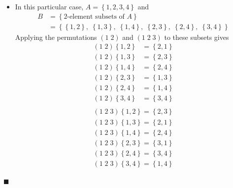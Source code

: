 \documentclass[12pt]{article}
\renewcommand{\qed}{\hfill$\blacksquare$}
\renewenvironment{proof}{\begin{addmargin}[1em]{0em}\begin{newproof}}{\end{newproof}\end{addmargin}\qed}
\begin{document}
\begin{proof}
\begin{itemize}
    \item In this particular case, $A=\left\{1,2,3,4\right\}$ and
    \begin{equation*}
        \begin{split}
            B & = \left\{ \text{2-element subsets of } A \right\} \\
            & = \left\{ \left\{1,2\right\}, \; \left\{1,3\right\}, \; \left\{1,4\right\}, \; \left\{2,3\right\},\; \left\{2,4\right\}, \; \left\{3,4\right\}\right\}
        \end{split}
    \end{equation*}
    Applying the permutations $\left(1\;2\right)$ and $\left(1\;2\;3\right)$ to these subsets gives
    \begin{equation*}
        \begin{split}
            \left(1\;2\right) \left\{1,2 \right\} & = \left\{ 2,1 \right\} \\
            \left(1\;2\right) \left\{1,3 \right\} & = \left\{ 2,3 \right\} \\
            \left(1\;2\right) \left\{1,4 \right\} & = \left\{ 2,4 \right\} \\
            \left(1\;2\right) \left\{ 2,3\right\} & = \left\{1,3  \right\} \\
            \left(1\;2\right) \left\{2,4 \right\} & = \left\{ 1,4 \right\} \\
            \left(1\;2\right) \left\{3,4 \right\} & = \left\{ 3,4 \right\} \\
        \end{split}
    \end{equation*}
    \begin{equation*}
        \begin{split}
        \left(1\;2\;3\right) \left\{ 1,2\right\} = \left\{2,3 \right\} \\
        \left(1\;2\;3\right) \left\{1,3 \right\} = \left\{2,1 \right\} \\
        \left(1\;2\;3\right) \left\{ 1,4\right\} = \left\{2,4 \right\} \\
        \left(1\;2\;3\right) \left\{ 2,3\right\} = \left\{3,1 \right\} \\
        \left(1\;2\;3\right) \left\{2,4 \right\} = \left\{3,4 \right\} \\
        \left(1\;2\;3\right) \left\{ 3,4\right\} = \left\{1,4 \right\} \\
        \end{split}
    \end{equation*}
\end{itemize}
\end{proof}
\end{document}
